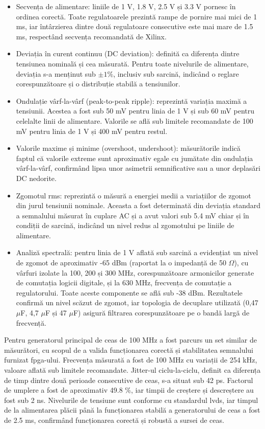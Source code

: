 \documentclass[12pt,a4paper]{report}
\begin{document}
\begin{itemize}
    \item Secvența de alimentare: liniile de 1 V, 1.8 V, 2.5 V și 3.3 V pornesc în ordinea corectă. Toate regulatoarele prezintă rampe de pornire mai mici de 1 ms, iar întârzierea dintre două regulatoare consecutive este mai mare de 1.5 ms, respectând secvența recomandată de Xilinx.
    \item Deviația în curent continuu (DC deviation): definită ca diferența dintre tensiunea nominală și cea măsurată. Pentru toate nivelurile de alimentare, deviația s-a menținut sub \(\pm 1\%\), inclusiv sub sarcină, indicând o reglare corespunzătoare și o distribuție stabilă a tensiunilor.
    \item Ondulație vârf-la-vârf (peak-to-peak ripple): reprezintă variația maximă a tensiunii. Acestea a fost sub 50 mV pentru linia de 1 V și sub 60 mV pentru celelalte linii de alimentare. Valorile se află sub limitele recomandate de 100 mV pentru linia de 1 V și 400 mV pentru restul.
    \item Valorile maxime și minime (overshoot, undershoot): măsurătorile indică faptul că valorile extreme sunt aproximativ egale cu jumătate din ondulația vârf-la-vârf, confirmând lipsa unor asimetrii semnificative sau a unor deplasări DC nedorite.
    \item Zgomotul \gls{rms}: reprezintă o măsură a energiei medii a variațiilor de zgomot din jurul tensiunii nominale. Aceasta a fost determinată din deviația standard a semnalului măsurat în cuplare AC și a avut valori sub 5.4 mV chiar și în condiții de sarcină, indicând un nivel redus al zgomotului pe liniile de alimentare.
    \item Analiză spectrală: pentru linia de 1 V aflată sub sarcină a evidențiat un nivel de zgomot de aproximativ -65 dBm (raportat la o impedanță de 50 \(\Omega\)), cu vârfuri izolate la 100, 200 și 300 MHz, corespunzătoare armonicilor generate de comutația logicii digitale, și la 630 MHz, frecvența de comutație a regulatorului. Toate aceste componente se află sub -38 dBm. Rezultatele confirmă un nivel scăzut de zgomot, iar topologia de decuplare utilizată (0,47 \(\mu\)F, 4,7 \(\mu\)F și 47 \(\mu\)F) asigură filtrarea corespunzătoare pe o bandă largă de frecvență.
\end{itemize}

Pentru generatorul principal de ceas de 100 MHz a fost parcurs un set similar de măsurători, cu scopul de a valida funcționarea corectă și stabilitatea semnalului furnizat \gls{fpga}-ului. Frecvența măsurată a fost de 100 MHz cu variații de 254 kHz, valoare aflată sub limitele recomandate. Jitter-ul ciclu-la-ciclu, definit ca diferența de timp dintre două perioade consecutive de ceas, s-a situat sub 42 ps. Factorul de umplere a fost de aproximativ 49.8 \%, iar timpii de creștere și descreștere au fost sub 2 ns. Nivelurile de tensiune sunt conforme cu standardul \gls{lvds}, iar timpul de la alimentarea plăcii până la funcționarea stabilă a generatorului de ceas a fost de 2.5 ms, confirmând funcționarea corectă și robustă a sursei de ceas.
\end{document}
